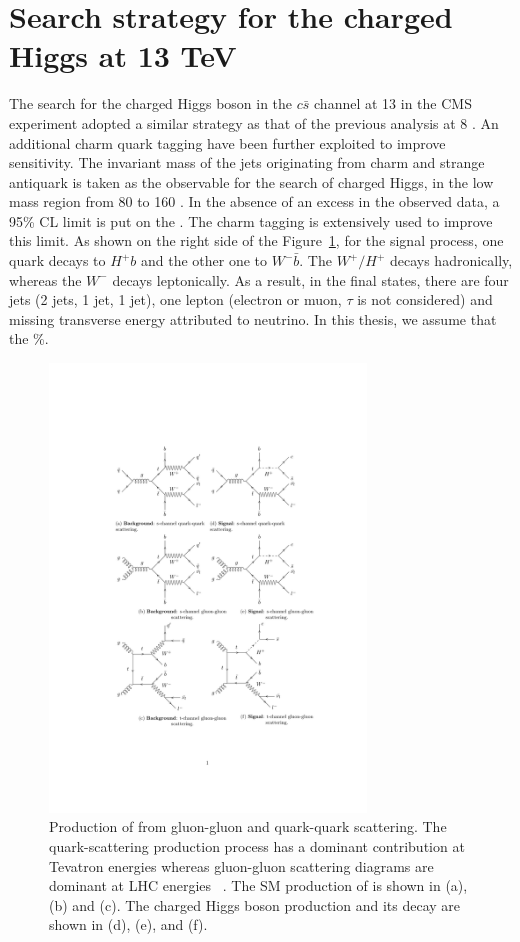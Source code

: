  
\section{Search strategy for the charged Higgs at 13 TeV}
\label{s:searchStrategy}

The search for the charged Higgs boson in the $c\bar{s}$ channel at 13 \TeV 
in the CMS experiment adopted a similar strategy as that of the previous analysis
at 8 \TeV \cite{Khachatryan:2015uua}. An additional charm quark tagging have been
further exploited to improve sensitivity. The invariant mass of the jets originating from 
charm and strange antiquark is taken as the observable for the search of charged Higgs, in the 
low mass region from 80 to 160 \GeV. In the absence of an excess in the observed data,
a 95\% CL limit is put on the \brThb. The charm tagging is extensively used to
improve this limit. As shown on the right side of the Figure~\ref{fig:feyn_diag_sig}, 
for the signal process, one \PQt quark decays to $H^+ b$ and the other one to 
$W^- \bar{b}$. The $W^+/H^+$ decays hadronically, whereas the $W^-$ decays 
leptonically. As a result, in the final states, there are four jets (2 \PQb jets, 
1 \PQc jet, 1 \PQs jet), one lepton (electron or muon, $\tau$ is not considered) 
and missing transverse energy attributed to neutrino. In this thesis, we assume that the \%.
\begin{figure}
\centering
\includegraphics[width=0.75\textwidth]{Image/FeynDiag/feyn_diag_sig.pdf}
\caption{Production of \ttbar from gluon-gluon and quark-quark scattering. 
         The quark-scattering production process has a dominant contribution at 
         Tevatron energies whereas gluon-gluon scattering diagrams are dominant 
         at LHC energies ~\cite{Gerber:2014xea, Fiorini:2012fe}. The SM production
         of \ttbar is shown in (a), (b) and (c). The charged Higgs boson 
         production and its decay are shown in (d), (e), and (f).}
\label{fig:feyn_diag_sig}
\end{figure}

